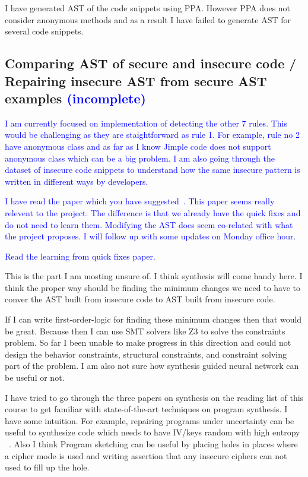 \documentclass[sigconf]{acmart}
\begin{document}
 I have generated AST of the code snippets using PPA. However PPA does not consider anonymous methods and as a result I have failed to generate AST for several code snippets.
\fi 
\subsection{Comparing AST of secure and insecure code / Repairing insecure AST from secure AST examples \textcolor{blue}{(incomplete)}}
\textcolor{blue}{
I am currently focused on implementation of detecting the other 7 rules. This would be challenging as they are staightforward as rule 1. For example, rule no 2 have anonymous class and as far as I know Jimple code does not support  anonymous class which can be a big problem. I am also going through the dataset of insecure code snippets to understand how the same insecure pattern is written in different ways by developers.} 

\textcolor{blue}{
I have read the paper which you have suggested~\cite{rolim2018learning}. This paper seems really relevent to the project. The difference is that we already have the quick fixes and do not need to learn them. Modifying the AST does seem co-related with what the project proposes. I will follow up with some updates on Monday office hour.}

\iffalse
\textcolor{blue}{Read the learning from quick fixes paper.}

This is the part I am mosting unsure of. I think synthesis will come handy here. 
I think the proper way should be finding the minimum changes we need to have to conver the AST built from insecure code to AST built from insecure code.  

If I can write first-order-logic for finding these minimum changes then that would be great. Because then I can use SMT solvers like Z3 to solve the constraints problem. 
So far I been unable to make progress in this direction and could not design the behavior constraints, structural constraints, and constraint solving part of the problem. I am also not sure how synthesis guided neural network can be useful or not. 

I have tried to go through the three papers on synthesis on the reading list of this course to get familiar with state-of-the-art techniques on program synthesis. I have some intuition. For example, repairing programs under uncertainty can be useful to synthesize code which needs to have IV/keys random with high entropy ~\cite{albarghouthi2017repairing}. Also I think Program sketching can be useful by placing holes in places where a cipher mode is used and writing assertion that any insecure ciphers can not used to fill up the hole.    
\end{document}
